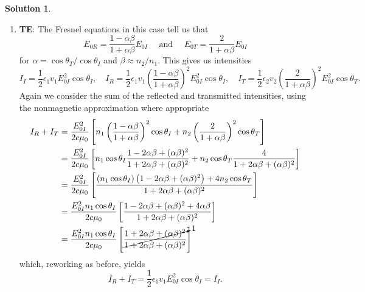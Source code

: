 \documentclass[10pt]{article}
\theoremstyle{definition}
\newtheorem{soln}{Solution}
\begin{document}
\begin{soln}
\begin{enumerate}[label=(\alph*)]
    \item {\bf{TE}}: The Fresnel equations in this case tell us that
          $$E_{0R}=\frac{1-\alpha\beta}{1+\alpha\beta}E_{0I}\quad\text{ and }\quad E_{0T}=\frac{2}{1+\alpha\beta}E_{0I}$$
          for $\alpha=\cos\theta_T/\cos\theta_I$ and $\beta\approx n_2/n_1$. This gives us intensities
          $$I_I=\frac{1}{2}\epsilon_1 v_1 E_{0I}^2\cos\theta_I,
            \quad I_R=\frac{1}{2}\epsilon_1 v_1 \left(\frac{1-\alpha\beta}{1+\alpha\beta}\right)^2E_{0I}^2\cos\theta_I,
            \quad I_T=\frac{1}{2}\epsilon_2 v_2 \left(\frac{2}{1+\alpha\beta}\right)^2E_{0I}^2\cos\theta_T.
          $$
          Again we consider the sum of the reflected and transmitted intensities, using the nonmagnetic approximation where appropriate
          \begin{align*}
            I_R+I_T & =\frac{E_{0I}^2}{2c\mu_0}\left[
              n_1\left(\frac{1-\alpha\beta}{1+\alpha\beta}\right)^2\cos\theta_I
              +n_2 \left(\frac{2}{1+\alpha\beta}\right)^2\cos\theta_T
            \right]                                                  \\
                    & =\frac{E_{0I}^2}{2c\mu_0}\left[
              n_1\cos\theta_I\frac{1-2\alpha\beta+(\alpha\beta)^2}{1+2\alpha\beta+(\alpha\beta)^2}
              +n_2\cos\theta_T \frac{4}{1+2\alpha\beta+(\alpha\beta)^2}
            \right]                                                  \\
                    & =\frac{E_{0I}^2}{2c\mu_0}\left[
              \frac{\left(n_1\cos\theta_I\right)\left(1-2\alpha\beta+(\alpha\beta)^2\right)+4n_2\cos\theta_T}{1+2\alpha\beta+(\alpha\beta)^2}
            \right]                                                  \\
                    & =\frac{E_{0I}^2n_1\cos\theta_I}{2c\mu_0}\left[
              \frac{1-2\alpha\beta+(\alpha\beta)^2+4\alpha\beta}{1+2\alpha\beta+(\alpha\beta)^2}
            \right]                                                  \\
                    & =\frac{E_{0I}^2n_1\cos\theta_I}{2c\mu_0}\left[
              \cancelto{1}{\frac{1+2\alpha\beta+(\alpha\beta)^2}{1+2\alpha\beta+(\alpha\beta)^2}}
              \right]
          \end{align*}
          which, reworking as before, yields
          $$I_R+I_T=\frac{1}{2}\epsilon_1 v_1 E_{0I}^2\cos\theta_I=I_I.$$
  \end{enumerate}
\end{soln}
\end{document}
